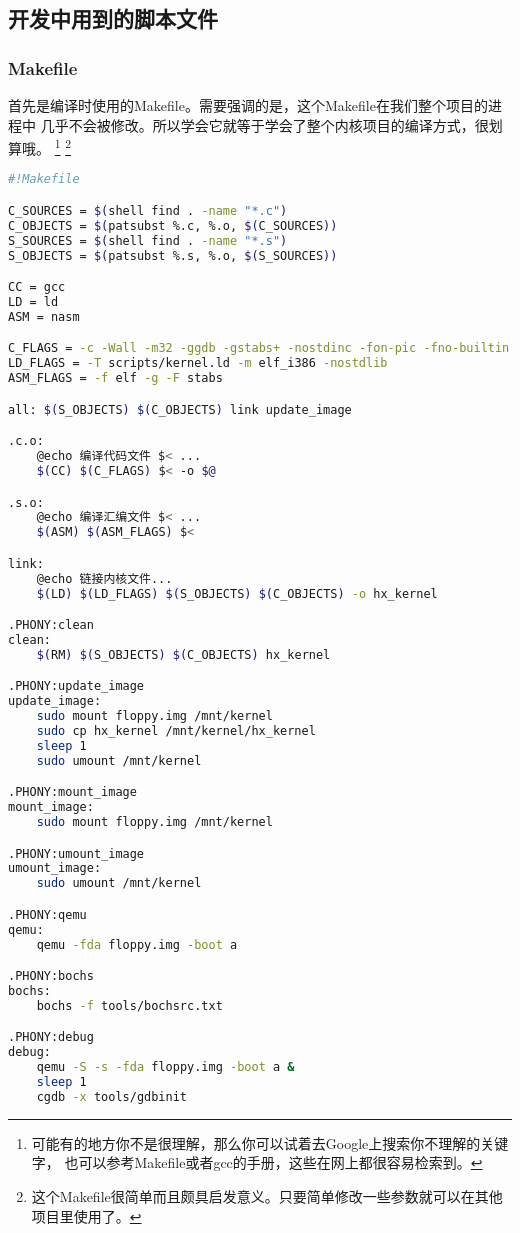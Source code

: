 \subsection{开发中用到的脚本文件}

\subsubsection{Makefile}
\par 首先是编译时使用的Makefile。需要强调的是，这个Makefile在我们整个项目的进程中\allowbreak
几乎不会被修改。所以学会它就等于学会了整个内核项目的编译方式，很划算哦。
\footnote{可能有的地方你不是很理解，那么你可以试着去Google上搜索你不理解的关键字，\allowbreak
也可以参考Makefile或者gcc的手册，这些在网上都很容易检索到。}
\footnote{这个Makefile很简单而且颇具启发意义。只要简单修改一些参数就可以在其他项目里使用了。}

\begin{lstlisting}[language = sh, caption = Makefile]
#!Makefile

C_SOURCES = $(shell find . -name "*.c")
C_OBJECTS = $(patsubst %.c, %.o, $(C_SOURCES))
S_SOURCES = $(shell find . -name "*.s")
S_OBJECTS = $(patsubst %.s, %.o, $(S_SOURCES))

CC = gcc
LD = ld
ASM = nasm

C_FLAGS = -c -Wall -m32 -ggdb -gstabs+ -nostdinc -fon-pic -fno-builtin -fno-stack-protector -I include
LD_FLAGS = -T scripts/kernel.ld -m elf_i386 -nostdlib
ASM_FLAGS = -f elf -g -F stabs

all: $(S_OBJECTS) $(C_OBJECTS) link update_image

.c.o:
	@echo 编译代码文件 $< ...
	$(CC) $(C_FLAGS) $< -o $@

.s.o:
	@echo 编译汇编文件 $< ...
	$(ASM) $(ASM_FLAGS) $<

link:
	@echo 链接内核文件...
	$(LD) $(LD_FLAGS) $(S_OBJECTS) $(C_OBJECTS) -o hx_kernel

.PHONY:clean
clean:
	$(RM) $(S_OBJECTS) $(C_OBJECTS) hx_kernel

.PHONY:update_image
update_image:
	sudo mount floppy.img /mnt/kernel
	sudo cp hx_kernel /mnt/kernel/hx_kernel
	sleep 1
	sudo umount /mnt/kernel

.PHONY:mount_image
mount_image:
	sudo mount floppy.img /mnt/kernel

.PHONY:umount_image
umount_image:
	sudo umount /mnt/kernel

.PHONY:qemu
qemu:
	qemu -fda floppy.img -boot a

.PHONY:bochs
bochs:
	bochs -f tools/bochsrc.txt

.PHONY:debug
debug:
	qemu -S -s -fda floppy.img -boot a &
	sleep 1
	cgdb -x tools/gdbinit

\end{lstlisting} 

